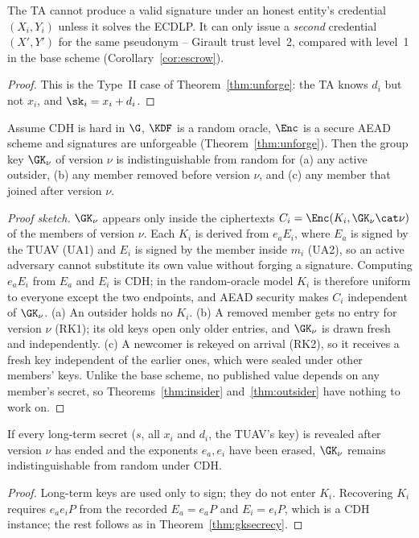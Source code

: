 \begin{theorem}\label{thm:noescrow}
The TA cannot produce a valid signature under an honest entity's credential $(X_i,Y_i)$ unless it solves the ECDLP. It can only issue a \emph{second}
credential $(X',Y')$ for the same pseudonym -- Girault trust level~2, compared with level~1 in the base scheme (Corollary~\ref{cor:escrow}).
\end{theorem}
\begin{proof}
This is the Type~II case of Theorem~\ref{thm:unforge}: the TA knows $d_i$ but not $x_i$, and $\sk_i=x_i+d_i$.
\end{proof}

\begin{theorem}\label{thm:gksecrecy}
Assume CDH is hard in $\G$, $\KDF$ is a random oracle, $\Enc$ is a secure AEAD scheme and signatures are unforgeable (Theorem~\ref{thm:unforge}). Then the
group key $\GK_\nu$ of version $\nu$ is indistinguishable from random for (a) any active outsider, (b) any member removed before version $\nu$, and (c) any
member that joined after version $\nu$.
\end{theorem}
\begin{proof}[Proof sketch]
$\GK_\nu$ appears only inside the ciphertexts $C_i=\Enc(K_i,\GK_\nu\cat\nu)$ of the members of version $\nu$. Each $K_i$ is derived from $e_aE_i$, where
$E_a$ is signed by the TUAV (UA1) and $E_i$ is signed by the member inside $m_i$ (UA2), so an active adversary cannot substitute its own value without
forging a signature. Computing $e_aE_i$ from $E_a$ and $E_i$ is CDH; in the random-oracle model $K_i$ is therefore uniform to everyone except the two
endpoints, and AEAD security makes $C_i$ independent of $\GK_\nu$. (a) An outsider holds no $K_i$. (b) A removed member gets no entry for version $\nu$
(RK1); its old keys open only older entries, and $\GK_\nu$ is drawn fresh and independently. (c) A newcomer is rekeyed on arrival (RK2), so it receives a
fresh key independent of the earlier ones, which were sealed under other members' keys. Unlike the base scheme, no published value depends on any member's
secret, so Theorems~\ref{thm:insider} and~\ref{thm:outsider} have nothing to work on.
\end{proof}

\begin{theorem}\label{thm:fs}
If every long-term secret ($s$, all $x_i$ and $d_i$, the TUAV's key) is revealed after version $\nu$ has ended and the exponents $e_a,e_i$ have been
erased, $\GK_\nu$ remains indistinguishable from random under CDH.
\end{theorem}
\begin{proof}
Long-term keys are used only to sign; they do not enter $K_i$. Recovering $K_i$ requires $e_ae_iP$ from the recorded $E_a=e_aP$ and $E_i=e_iP$, which is
a CDH instance; the rest follows as in Theorem~\ref{thm:gksecrecy}.
\end{proof}

